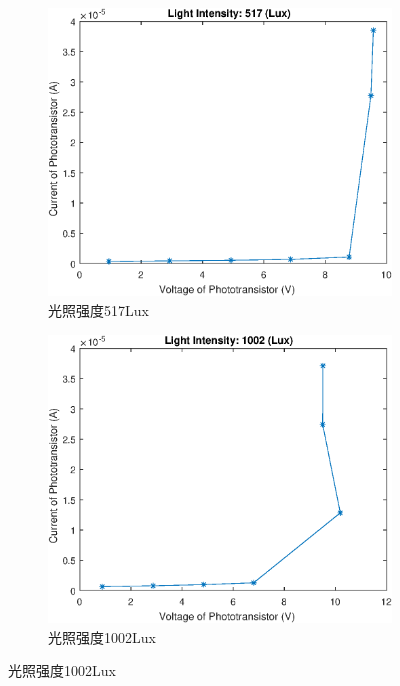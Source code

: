 \documentclass{ctexart}
\begin{document}
\begin{figure}[H]
  \centering
  \begin{subfigure}{.45\textwidth}
    \centering
    \includegraphics[width=\linewidth]{光电传感器综合实验图像/phototransistor_517Lux}
    \caption{光照强度517Lux}
  \end{subfigure}
  \begin{subfigure}{.45\textwidth}
    \centering
    \includegraphics[width=\linewidth]{光电传感器综合实验图像/phototransistor_1002Lux}
    \caption{光照强度1002Lux}

\end{subfigure}
\end{figure}
\end{document}
